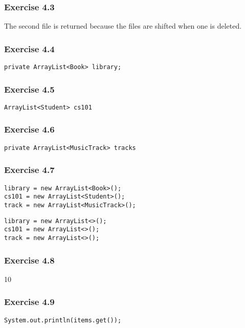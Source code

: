 \subsubsection{Exercise 4.3}
The second file is returned because the files are shifted when one is deleted. 

\subsubsection{Exercise 4.4}
\begin{lstlisting}
private ArrayList<Book> library;
\end{lstlisting}

\subsubsection{Exercise 4.5}
\begin{lstlisting}
ArrayList<Student> cs101
\end{lstlisting}

\subsubsection{Exercise 4.6}
\begin{lstlisting}
private ArrayList<MusicTrack> tracks
\end{lstlisting}

\subsubsection{Exercise 4.7}
\begin{lstlisting}[caption=without diamond notation]
library = new ArrayList<Book>();
cs101 = new ArrayList<Student>();
track = new ArrayList<MusicTrack>();
\end{lstlisting}
\begin{lstlisting}[caption=with diamond notation]
library = new ArrayList<>();
cs101 = new ArrayList<>();
track = new ArrayList<>();
\end{lstlisting}

\subsubsection{Exercise 4.8}
10

\subsubsection{Exercise 4.9}
\begin{lstlisting}
System.out.println(items.get());
\end{lstlisting}

